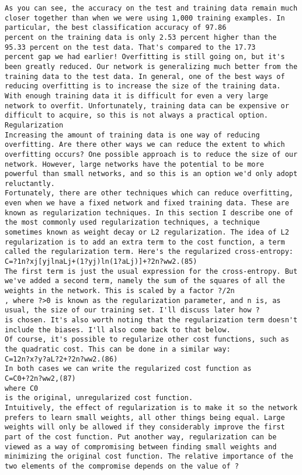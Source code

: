 \begin{lstlisting}
As you can see, the accuracy on the test and training data remain much closer together than when we were using 1,000 training examples. In particular, the best classification accuracy of 97.86
percent on the training data is only 2.53 percent higher than the 95.33 percent on the test data. That's compared to the 17.73
percent gap we had earlier! Overfitting is still going on, but it's been greatly reduced. Our network is generalizing much better from the training data to the test data. In general, one of the best ways of reducing overfitting is to increase the size of the training data. With enough training data it is difficult for even a very large network to overfit. Unfortunately, training data can be expensive or difficult to acquire, so this is not always a practical option.
Regularization
Increasing the amount of training data is one way of reducing overfitting. Are there other ways we can reduce the extent to which overfitting occurs? One possible approach is to reduce the size of our network. However, large networks have the potential to be more powerful than small networks, and so this is an option we'd only adopt reluctantly.
Fortunately, there are other techniques which can reduce overfitting, even when we have a fixed network and fixed training data. These are known as regularization techniques. In this section I describe one of the most commonly used regularization techniques, a technique sometimes known as weight decay or L2 regularization. The idea of L2 regularization is to add an extra term to the cost function, a term called the regularization term. Here's the regularized cross-entropy:
C=?1n?xj[yjlnaLj+(1?yj)ln(1?aLj)]+?2n?ww2.(85)
The first term is just the usual expression for the cross-entropy. But we've added a second term, namely the sum of the squares of all the weights in the network. This is scaled by a factor ?/2n
, where ?>0 is known as the regularization parameter, and n is, as usual, the size of our training set. I'll discuss later how ?
is chosen. It's also worth noting that the regularization term doesn't include the biases. I'll also come back to that below.
Of course, it's possible to regularize other cost functions, such as the quadratic cost. This can be done in a similar way:
C=12n?x?y?aL?2+?2n?ww2.(86)
In both cases we can write the regularized cost function as 
C=C0+?2n?ww2,(87)
where C0
is the original, unregularized cost function.
Intuitively, the effect of regularization is to make it so the network prefers to learn small weights, all other things being equal. Large weights will only be allowed if they considerably improve the first part of the cost function. Put another way, regularization can be viewed as a way of compromising between finding small weights and minimizing the original cost function. The relative importance of the two elements of the compromise depends on the value of ?

\end{lstlisting}
